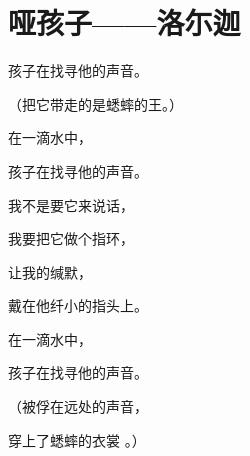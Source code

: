 
\section{哑孩子——洛尓迦}

孩子在找寻他的声音。

（把它带走的是蟋蟀的王。）

在一滴水中，

孩子在找寻他的声音。

我不是要它来说话，

我要把它做个指环，

让我的缄默，

戴在他纤小的指头上。

在一滴水中，

孩子在找寻他的声音。

（被俘在远处的声音，

穿上了蟋蟀的衣裳 。）

